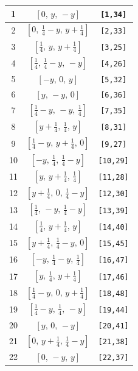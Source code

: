 \documentclass[fleqn,8pt]{jsarticle}
\begin{document}
\begin{longtable}{ccc}
1 & $\left[ 0,\, y,\, - y \right]$ & {\tt [1,34]} \\ \hline
2 & $\left[ 0,\, \frac{1}{4} - y,\, y + \frac{1}{4} \right]$ & {\tt [2,33]} \\ \hline
3 & $\left[ \frac{1}{4},\, y,\, y + \frac{1}{4} \right]$ & {\tt [3,25]} \\ \hline
4 & $\left[ \frac{1}{4},\, \frac{1}{4} - y,\, - y \right]$ & {\tt [4,26]} \\ \hline
5 & $\left[ - y,\, 0,\, y \right]$ & {\tt [5,32]} \\ \hline
6 & $\left[ y,\, - y,\, 0 \right]$ & {\tt [6,36]} \\ \hline
7 & $\left[ \frac{1}{4} - y,\, - y,\, \frac{1}{4} \right]$ & {\tt [7,35]} \\ \hline
8 & $\left[ y + \frac{1}{4},\, \frac{1}{4},\, y \right]$ & {\tt [8,31]} \\ \hline
9 & $\left[ \frac{1}{4} - y,\, y + \frac{1}{4},\, 0 \right]$ & {\tt [9,27]} \\ \hline
10 & $\left[ - y,\, \frac{1}{4},\, \frac{1}{4} - y \right]$ & {\tt [10,29]} \\ \hline
11 & $\left[ y,\, y + \frac{1}{4},\, \frac{1}{4} \right]$ & {\tt [11,28]} \\ \hline
12 & $\left[ y + \frac{1}{4},\, 0,\, \frac{1}{4} - y \right]$ & {\tt [12,30]} \\ \hline
13 & $\left[ \frac{1}{4},\, - y,\, \frac{1}{4} - y \right]$ & {\tt [13,39]} \\ \hline
14 & $\left[ \frac{1}{4},\, y + \frac{1}{4},\, y \right]$ & {\tt [14,40]} \\ \hline
15 & $\left[ y + \frac{1}{4},\, \frac{1}{4} - y,\, 0 \right]$ & {\tt [15,45]} \\ \hline
16 & $\left[ - y,\, \frac{1}{4} - y,\, \frac{1}{4} \right]$ & {\tt [16,47]} \\ \hline
17 & $\left[ y,\, \frac{1}{4},\, y + \frac{1}{4} \right]$ & {\tt [17,46]} \\ \hline
18 & $\left[ \frac{1}{4} - y,\, 0,\, y + \frac{1}{4} \right]$ & {\tt [18,48]} \\ \hline
19 & $\left[ \frac{1}{4} - y,\, \frac{1}{4},\, - y \right]$ & {\tt [19,44]} \\ \hline
20 & $\left[ y,\, 0,\, - y \right]$ & {\tt [20,41]} \\ \hline
21 & $\left[ 0,\, y + \frac{1}{4},\, \frac{1}{4} - y \right]$ & {\tt [21,38]} \\ \hline
22 & $\left[ 0,\, - y,\, y \right]$ & {\tt [22,37]} \\ \hline

\end{longtable}
\end{document}
